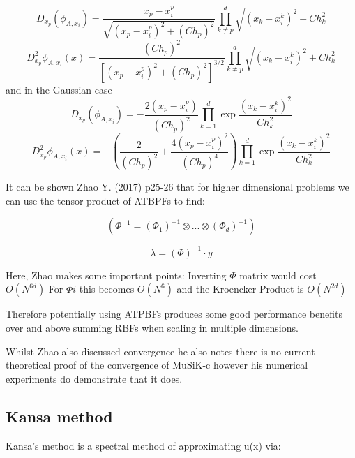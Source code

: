 \documentclass[a4paper]{amsart}
\begin{document}
\begin{equation}
D_{x_{p}}(\phi_{A,x_{i}})=\frac{x_{p}-x^{p}_{i}}{\sqrt{(x_{p}-x^{p}_{i})^{2} + (Ch_{p})^2 }} \prod^{d}_{k\neq p}\sqrt{(x_{k}-x^{k}_{i})^{2}+Ch^{2}_k}
\end{equation}
\begin{equation}
D_{x_{p}}^{2}\phi_{A,x_{i}}(x)=\frac{(Ch_{p})^{2}}{[(x_{p}-x^{p}_{i})^{2} + (Ch_{p})^2 ]^{3/2}} \prod^{d}_{k\neq p}\sqrt{(x_{k}-x^{k}_{i})^{2}+Ch^{2}_k}
\end{equation}
and in the Gaussian case
\begin{equation}
D_{x_{p}}(\phi_{A,x_{i}})= -\frac{2(x_{p}-x^{p}_{i})}{(Ch_{p})^{2}} \prod^{d}_{k=1}\exp{\frac{(x_{k}-x^{k}_{i})^{2}}{ Ch^{2}_k}}
\end{equation}
\begin{equation}
D_{x_{p}}^{2}\phi_{A,x_{i}}(x)= -(\frac{2}{(Ch_{p})^{2}} + \frac{4(x_{p}-x^{p}_{i})^{2}}{(Ch_{p})^{4}}) \prod^{d}_{k=1}\exp{\frac{(x_{k}-x^{k}_{i})^{2}}{ Ch^{2}_k}}
\end{equation}


It can be shown Zhao Y. (2017) p25-26 \cite{mski0} that for higher dimensional problems we can use the tensor product of ATBPFs to find:

\begin{equation}
(\Phi^{-1}=(\Phi_{1})^{-1} \otimes ... \otimes  (\Phi_{d})^{-1} )
\end{equation}

\begin{equation}
\lambda = (\Phi)^{-1} \cdot y
\end{equation}

Here, Zhao makes some important points:
Inverting $\Phi$ matrix would cost $O(N^{6d})$
For $\Phi{i}$ this becomes $O(N^{6})$
and the Kroencker Product is $O(N^{2d})$

Therefore potentially using ATPBFs produces some good performance benefits over and above summing RBFs when scaling in multiple dimensions.

Whilst Zhao also discussed convergence he also notes there is no current theoretical proof of the convergence of MuSiK-c however his numerical experiments do demonstrate that it does.

\subsection{Kansa method}

Kansa's method \cite{rbf1} \cite{rbf2} is a spectral method of approximating u(x) via:
\end{document}
